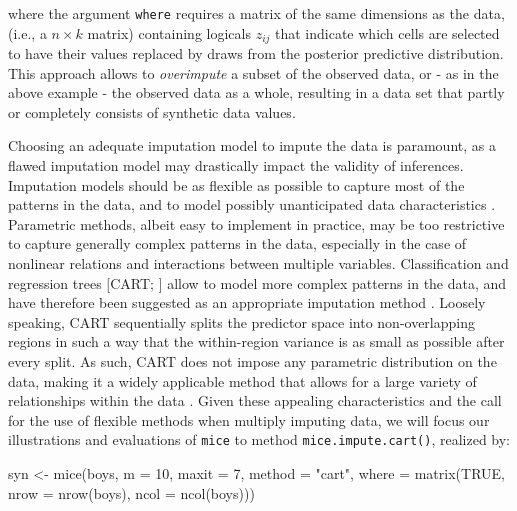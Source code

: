 \documentclass[psych,article,submit,moreauthors,pdftex]{mdpi}
\newenvironment{Shaded}{\begin{snugshade}}{\end{snugshade}}
\newcommand{\AttributeTok}[1]{\textcolor[rgb]{0.77,0.63,0.00}{#1}}
\newcommand{\ConstantTok}[1]{\textcolor[rgb]{0.00,0.00,0.00}{#1}}
\newcommand{\DecValTok}[1]{\textcolor[rgb]{0.00,0.00,0.81}{#1}}
\newcommand{\FunctionTok}[1]{\textcolor[rgb]{0.00,0.00,0.00}{#1}}
\newcommand{\NormalTok}[1]{#1}
\newcommand{\OtherTok}[1]{\textcolor[rgb]{0.56,0.35,0.01}{#1}}
\newcommand{\StringTok}[1]{\textcolor[rgb]{0.31,0.60,0.02}{#1}}
\begin{document}
where the argument \texttt{where} requires a matrix of the same
dimensions as the data, (i.e., a \(n \times k\) matrix) containing
logicals \(z_{ij}\) that indicate which cells are selected to have their
values replaced by draws from the posterior predictive distribution.
This approach allows to \emph{overimpute} a subset of the observed data,
or - as in the above example - the observed data as a whole, resulting
in a data set that partly or completely consists of synthetic data
values.

Choosing an adequate imputation model to impute the data is paramount,
as a flawed imputation model may drastically impact the validity of
inferences. Imputation models should be as flexible as possible to
capture most of the patterns in the data, and to model possibly
unanticipated data characteristics
\citep{murray_multiple_2018, rubin_18years_1996}. Parametric methods,
albeit easy to implement in practice, may be too restrictive to capture
generally complex patterns in the data, especially in the case of
nonlinear relations and interactions between multiple variables.
Classification and regression trees {[}CART;
\citet{breiman_cart_1984}{]} allow to model more complex patterns in the
data, and have therefore been suggested as an appropriate imputation
method
\citep{reiter_cart_2005, burgette_reiter_cart_2010, doove_buuren_recursive_2014}.
Loosely speaking, CART sequentially splits the predictor space into
non-overlapping regions in such a way that the within-region variance is
as small as possible after every split. As such, CART does not impose
any parametric distribution on the data, making it a widely applicable
method that allows for a large variety of relationships within the data
\citep{islr_2013}. Given these appealing characteristics and the call
for the use of flexible methods when multiply imputing data, we will
focus our illustrations and evaluations of \texttt{mice} to method
\texttt{mice.impute.cart()}, realized by:

\begin{Shaded}
\begin{Highlighting}[]
\NormalTok{syn }\OtherTok{\textless{}{-}} \FunctionTok{mice}\NormalTok{(boys, }
            \AttributeTok{m =} \DecValTok{10}\NormalTok{,}
            \AttributeTok{maxit =} \DecValTok{7}\NormalTok{, }
            \AttributeTok{method =} \StringTok{"cart"}\NormalTok{,}
            \AttributeTok{where =} \FunctionTok{matrix}\NormalTok{(}\ConstantTok{TRUE}\NormalTok{, }
                           \AttributeTok{nrow =} \FunctionTok{nrow}\NormalTok{(boys),}
                           \AttributeTok{ncol =} \FunctionTok{ncol}\NormalTok{(boys)))}
\end{Highlighting}
\end{Shaded}
\end{document}
